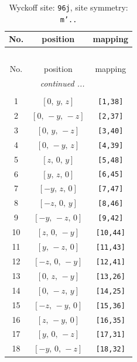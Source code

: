 \documentclass[fleqn,8pt]{jsarticle}
\begin{document}
\begin{longtable}{ccc}
\caption{Wyckoff site: {\tt 96j}, site symmetry: {\tt m'..}}
 \\
 \hline \hline
No. & position & mapping \\ \hline \endfirsthead

\multicolumn{2}{l}{\tablename\ \thetable{}} \\
 \hline \hline
No. & position & mapping \\ \hline \endhead

 \hline \hline
\multicolumn{2}{r}{\footnotesize\it continued ...} \\ \endfoot

 \hline \hline
\multicolumn{2}{r}{} \\ \endlastfoot

1 & $\left[ 0,\, y,\, z \right]$ & {\tt [1,38]} \\ \hline
2 & $\left[ 0,\, - y,\, - z \right]$ & {\tt [2,37]} \\ \hline
3 & $\left[ 0,\, y,\, - z \right]$ & {\tt [3,40]} \\ \hline
4 & $\left[ 0,\, - y,\, z \right]$ & {\tt [4,39]} \\ \hline
5 & $\left[ z,\, 0,\, y \right]$ & {\tt [5,48]} \\ \hline
6 & $\left[ y,\, z,\, 0 \right]$ & {\tt [6,45]} \\ \hline
7 & $\left[ - y,\, z,\, 0 \right]$ & {\tt [7,47]} \\ \hline
8 & $\left[ - z,\, 0,\, y \right]$ & {\tt [8,46]} \\ \hline
9 & $\left[ - y,\, - z,\, 0 \right]$ & {\tt [9,42]} \\ \hline
10 & $\left[ z,\, 0,\, - y \right]$ & {\tt [10,44]} \\ \hline
11 & $\left[ y,\, - z,\, 0 \right]$ & {\tt [11,43]} \\ \hline
12 & $\left[ - z,\, 0,\, - y \right]$ & {\tt [12,41]} \\ \hline
13 & $\left[ 0,\, z,\, - y \right]$ & {\tt [13,26]} \\ \hline
14 & $\left[ 0,\, - z,\, y \right]$ & {\tt [14,25]} \\ \hline
15 & $\left[ - z,\, - y,\, 0 \right]$ & {\tt [15,36]} \\ \hline
16 & $\left[ z,\, - y,\, 0 \right]$ & {\tt [16,35]} \\ \hline
17 & $\left[ y,\, 0,\, - z \right]$ & {\tt [17,31]} \\ \hline
18 & $\left[ - y,\, 0,\, - z \right]$ & {\tt [18,32]} \\ \hline

\end{longtable}
\end{document}
